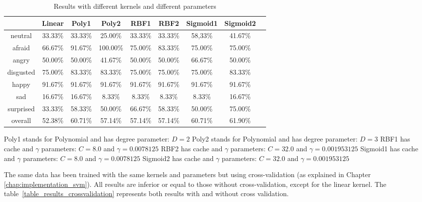 \begin{table}[h]
   \caption{\label{table_results_kernels} Results with different kernels and different parameters}
\begin{tabular}{|c|c|c|c|c|c|c|c|c|}
  \hline
    & Linear & Poly1 & Poly2 & RBF1 & RBF2 & Sigmoid1 & Sigmoid2 \\
  \hline
  neutral & 33.33\% & 33.33\% & 25.00\% & 33.33\% & 33.33\% & 58,33\% & 41.67\% \\
  afraid & 66.67\% & 91.67\% & 100.00\% & 75.00\% & 83.33\% & 75.00\% & 75.00\% \\
  angry & 50.00\% & 50.00\% & 41.67\% & 50.00\% & 50.00\% & 66.67\% & 50.00\% \\
  disgusted & 75.00\% & 83.33\% & 83.33\% & 75.00\% & 75.00\% & 75.00\% & 83.33\% \\
  happy & 91.67\% & 91.67\% & 91.67\% & 91.67\% & 91.67\% & 91.67\% & 91.67\% \\
  sad & 16.67\% & 16.67\% & 8.33\% & 8.33\% & 8.33\% & 8.33\% & 16.67\% \\
  surprised & 33.33\% & 58.33\% & 50.00\% & 66.67\% & 58.33\% & 50.00\% & 75.00\% \\
  overall & 52.38\% & 60.71\% & 57.14\% & 57.14\% & 57.14\% & 60.71\% & 61.90\% \\
  \hline
\end{tabular}
\end{table}

\noindent Poly1 stands for Polynomial and has degree parameter: $ D = 2 $
\newline
\noindent Poly2 stands for Polynomial and has degree parameter: $ D = 3 $
\newline
\noindent RBF1 has cache and $\gamma$ parameters: $ C = 8.0 $ and $ \gamma = 0.0078125 $
\newline
\noindent RBF2 has cache and $\gamma$ parameters: $ C = 32.0 $ and $ \gamma = 0.001953125 $ 
\newline
\noindent Sigmoid1 has cache and $\gamma$ parameters: $ C = 8.0 $ and $ \gamma = 0.0078125 $
\newline
\noindent Sigmoid2 has cache and $\gamma$ parameters: $ C = 32.0 $ and $ \gamma = 0.001953125 $
\newline

\noindent The same data has been trained with the same kernels and parameters but using cross-validation (as explained in Chapter \ref{chap:implementation_svm}). All results are inferior or equal to those without cross-validation, except for the linear kernel. The table~\ref{table_results_crossvalidation} represents both results with and without cross validation.
\newline

